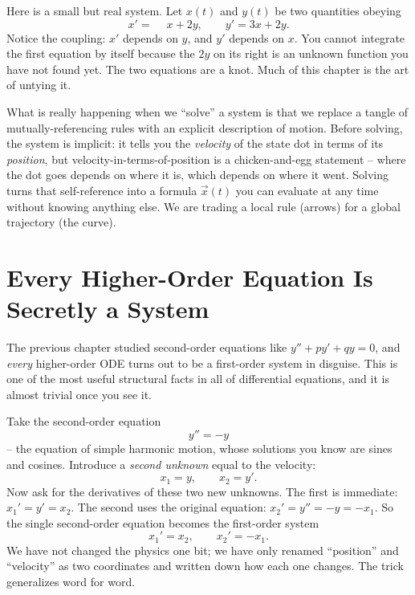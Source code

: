 Here is a small but real system. Let $x(t)$ and $y(t)$ be two quantities
obeying
\[
  x' = \phantom{-}x + 2y, \qquad y' = 3x + 2y.
\]
Notice the coupling: $x'$ depends on $y$, and $y'$ depends on $x$. You cannot
integrate the first equation by itself because the $2y$ on its right is an
unknown function you have not found yet. The two equations are a knot. Much of
this chapter is the art of untying it.

\begin{happeningbox}
What is really happening when we ``solve'' a system is that we replace a tangle
of mutually-referencing rules with an explicit description of motion. Before
solving, the system is implicit: it tells you the \emph{velocity} of the state
dot in terms of its \emph{position}, but velocity-in-terms-of-position is a
chicken-and-egg statement -- where the dot goes depends on where it is, which
depends on where it went. Solving turns that self-reference into a formula
$\vec x(t)$ you can evaluate at any time without knowing anything else. We are
trading a local rule (arrows) for a global trajectory (the curve).
\end{happeningbox}

\section{Every Higher-Order Equation Is Secretly a System}
\label{ch39:reduction}

The previous chapter studied second-order equations like $y'' + py' + qy = 0$,
and \emph{every} higher-order ODE turns out to be a first-order system in
disguise. This is one of the most useful structural facts in all of differential
equations, and it is almost trivial once you see it.

Take the second-order equation
\[
  y'' = -y
\]
-- the equation of simple harmonic motion, whose solutions you know are sines
and cosines. Introduce a \emph{second unknown} equal to the velocity:
\[
  x_1 = y, \qquad x_2 = y'.
\]
Now ask for the derivatives of these two new unknowns. The first is immediate:
$x_1' = y' = x_2$. The second uses the original equation: $x_2' = y'' = -y =
-x_1$. So the single second-order equation becomes the first-order system
\[
  x_1' = x_2, \qquad x_2' = -x_1.
\]
We have not changed the physics one bit; we have only renamed ``position'' and
``velocity'' as two coordinates and written down how each one changes. The
trick generalizes word for word.

